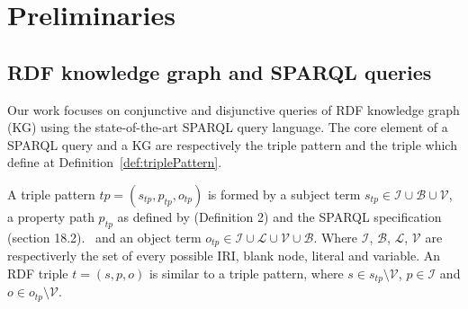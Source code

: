 \section{Preliminaries}






\subsection{RDF knowledge graph and SPARQL queries}
Our work focuses on conjunctive and disjunctive queries of RDF knowledge graph (KG) using the state-of-the-art SPARQL query language.
The core element of a SPARQL query and a KG are respectively the triple pattern and the triple which define at Definition~\ref{def:triplePattern}.

\begin{definition}\label{def:triplePattern}
    A triple pattern $tp = (s_{tp}, p_{tp} , o_{tp})$ is formed by a subject term $s_{tp} \in \mathcal{I} \cup \mathcal{B} \cup \mathcal{V}$, 
    a property path  $p_{tp}$ as defined by  \citeauthor{Kostylev2015} (Definition 2) and the SPARQL specification (section 18.2).~ 
    and an object term  $o_{tp} \in \mathcal{I} \cup \mathcal{L} \cup \mathcal{V} \cup \mathcal{B}$.
    Where $\mathcal{I}$, $\mathcal{B}$, $\mathcal{L}$, $\mathcal{V}$ are respectiverly the set of every possible IRI, blank node, literal and variable.
    An RDF triple $t = (s,p,o)$ is similar to a triple pattern, 
    where $s \in s_{tp} \setminus \mathcal{V}$,
    $p \in \mathcal{I}$ and $o \in o_{tp} \setminus \mathcal{V}$.
\end{definition}

